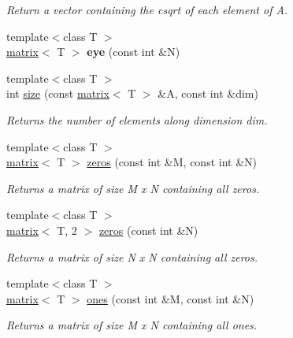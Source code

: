\begin{DoxyCompactItemize}
\begin{DoxyCompactList}\small\item\em Return a vector containing the csqrt of each element of A. \end{DoxyCompactList}\item 
\hypertarget{namespacekeycpp_a8ae33fb19a521ab1ec1f22e7c39ca076}{{\footnotesize template$<$class T $>$ }\\\hyperlink{classkeycpp_1_1matrix}{matrix}$<$ T $>$ {\bfseries eye} (const int \&N)}\label{namespacekeycpp_a8ae33fb19a521ab1ec1f22e7c39ca076}

\item 
{\footnotesize template$<$class T $>$ }\\int \hyperlink{namespacekeycpp_a2824156817719ffe96a842dd0ef27ae5}{size} (const \hyperlink{classkeycpp_1_1matrix}{matrix}$<$ T $>$ \&A, const int \&dim)
\begin{DoxyCompactList}\small\item\em Returns the number of elements along dimension dim. \end{DoxyCompactList}\item 
{\footnotesize template$<$class T $>$ }\\\hyperlink{classkeycpp_1_1matrix}{matrix}$<$ T $>$ \hyperlink{namespacekeycpp_a5699c522088657287bf0ac01173b716c}{zeros} (const int \&M, const int \&N)
\begin{DoxyCompactList}\small\item\em Returns a matrix of size M x N containing all zeros. \end{DoxyCompactList}\item 
{\footnotesize template$<$class T $>$ }\\\hyperlink{classkeycpp_1_1matrix}{matrix}$<$ T, 2 $>$ \hyperlink{namespacekeycpp_a3f2d2688097884d279a27fdbb38d35b6}{zeros} (const int \&N)
\begin{DoxyCompactList}\small\item\em Returns a matrix of size N x N containing all zeros. \end{DoxyCompactList}\item 
{\footnotesize template$<$class T $>$ }\\\hyperlink{classkeycpp_1_1matrix}{matrix}$<$ T $>$ \hyperlink{namespacekeycpp_a388f91a0ccf34978ef9403ccd0c680bf}{ones} (const int \&M, const int \&N)
\begin{DoxyCompactList}\small\item\em Returns a matrix of size M x N containing all ones. \end{DoxyCompactList}\item 

\end{DoxyCompactItemize}
